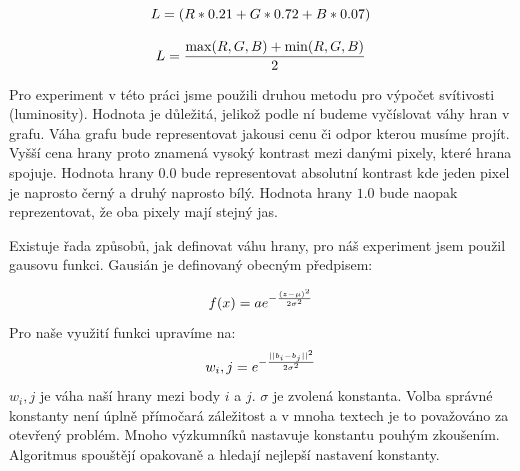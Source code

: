 \documentclass[czech, master, public, dept460, male, cpdeclaration, oneside]{diploma}
\begin{document}
\begin{equation}
\vspace*{+3.0mm}
L = (R * 0.21 + G * 0.72 + B * 0.07)
\end{equation}

\begin{equation}
\vspace*{+3.0mm}
L = \frac{\max(R, G, B) + \min(R, G, B)}{2}
\end{equation}

\noindent
Pro experiment v této práci jsme použili druhou metodu pro výpočet svítivosti (luminosity). Hodnota je důležitá, jelikož podle ní budeme vyčíslovat váhy hran v grafu. Váha grafu bude representovat jakousi cenu či odpor kterou musíme projít. Vyšší cena hrany proto znamená vysoký kontrast mezi danými pixely, které hrana spojuje. Hodnota hrany $0.0$ bude representovat absolutní kontrast kde jeden pixel je naprosto černý a druhý naprosto bílý. Hodnota hrany $1.0$ bude naopak reprezentovat, že oba pixely mají stejný jas.\par
Existuje řada způsobů, jak definovat váhu hrany, pro náš experiment jsem použil gausovu funkci. Gausián je definovaný obecným předpisem:

\begin{equation}
\vspace*{+3.0mm}
f(x) = ae^{- \frac{(z - \mu)^2}{2\sigma^2}}
\end{equation}
\noindent
Pro naše využití funkci upravíme na:
\begin{equation}
\vspace*{+3.0mm}
w_i, j = e^{- \frac{||b_i - b_j||^2}{2\sigma^2}}
\end{equation}
\noindent
$w_i, j$ je váha naší hrany mezi body $i$ a $j$.  $\sigma$ je zvolená konstanta. Volba správné konstanty není úplně přímočará záležitost a v mnoha textech je to považováno za otevřený problém. \cite{Zelnik} Mnoho výzkumníků nastavuje konstantu pouhým zkoušením. \cite{Jordan} Algoritmus spouštějí opakovaně a hledají nejlepší nastavení konstanty.
\end{document}
